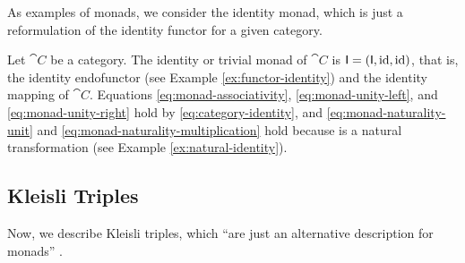 As examples of monads, we consider the identity monad, which is just a
reformulation of the identity functor for a given category.

\begin{example}
  \label{ex:monad-identity}

  Let $\cat{C}$ be a category. The identity or trivial monad of
  $\cat{C}$ is $\mathsf{I} = (\mathsf{I}, \operatorname{id}, \operatorname{id})$, that is, the identity
  endofunctor (see Example \ref{ex:functor-identity}) and the identity
  mapping of $\cat{C}$. Equations \eqref{eq:monad-associativity},
  \eqref{eq:monad-unity-left}, and \eqref{eq:monad-unity-right} hold
  by \eqref{eq:category-identity}, and
  \eqref{eq:monad-naturality-unit} and
  \eqref{eq:monad-naturality-multiplication} hold because \nat{\id} is
  a natural transformation (see Example \ref{ex:natural-identity}).

\end{example}

\subsection{Kleisli Triples}

Now, we describe Kleisli triples, which ``are just an alternative
description for monads'' \parencite[60]{moggi-1991}.

